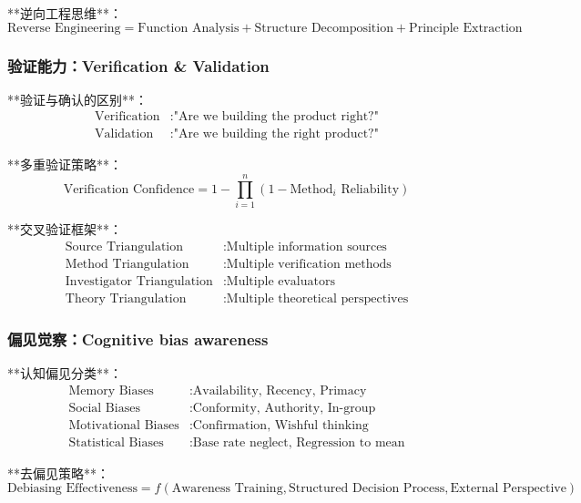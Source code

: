 **逆向工程思维**：
\begin{equation}
\text{Reverse Engineering} = \text{Function Analysis} + \text{Structure Decomposition} + \text{Principle Extraction}
\end{equation}

\subsubsection{验证能力：Verification \& Validation} %

**验证与确认的区别**：
\begin{align}
\text{Verification} &: \text{"Are we building the product right?"} \\
\text{Validation} &: \text{"Are we building the right product?"}
\end{align}

**多重验证策略**：
\begin{equation}
\text{Verification Confidence} = 1 - \prod_{i=1}^n (1 - \text{Method}_i \text{ Reliability})
\end{equation}

**交叉验证框架**：
\begin{align}
\text{Source Triangulation} &: \text{Multiple information sources} \\
\text{Method Triangulation} &: \text{Multiple verification methods} \\
\text{Investigator Triangulation} &: \text{Multiple evaluators} \\
\text{Theory Triangulation} &: \text{Multiple theoretical perspectives}
\end{align}

\subsubsection{偏见觉察：Cognitive bias awareness} %

**认知偏见分类**：
\begin{align}
\text{Memory Biases} &: \text{Availability, Recency, Primacy} \\
\text{Social Biases} &: \text{Conformity, Authority, In-group} \\
\text{Motivational Biases} &: \text{Confirmation, Wishful thinking} \\
\text{Statistical Biases} &: \text{Base rate neglect, Regression to mean}
\end{align}

**去偏见策略**：
\begin{equation}
\text{Debiasing Effectiveness} = f(\text{Awareness Training}, \text{Structured Decision Process}, \text{External Perspective})
\end{equation}

